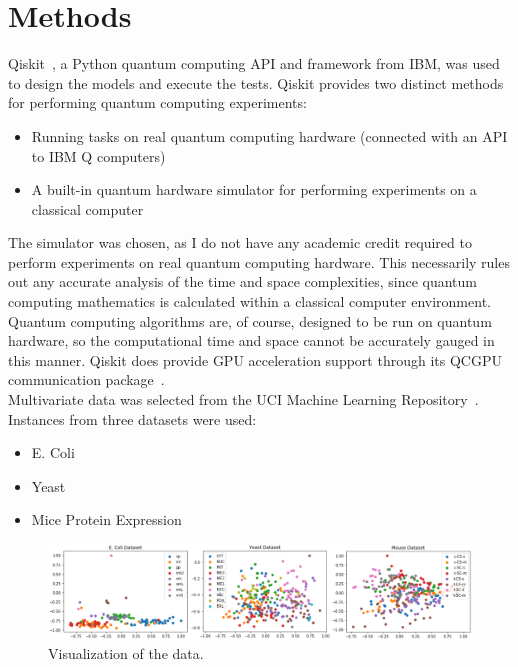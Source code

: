 \documentclass{article}
\begin{document}
\section{Methods}
  Qiskit~\cite{ibm}, a Python quantum computing API and framework from IBM, was used to design the models and execute the tests. Qiskit provides two distinct methods for performing quantum computing experiments:

    \begin{itemize}
      \item{Running tasks on real quantum computing hardware (connected with an API to IBM Q computers)}
      \item{A built-in quantum hardware simulator for performing experiments on a classical computer}
    \end{itemize}

  The simulator was chosen, as I do not have any academic credit required to perform experiments on real quantum computing hardware. This necessarily rules out any accurate analysis of the time and space complexities, since quantum computing mathematics is calculated within a classical computer environment. Quantum computing algorithms are, of course, designed to be run on quantum hardware, so the computational time and space cannot be accurately gauged in this manner. Qiskit does provide GPU acceleration support through its QCGPU communication package~\cite{qcgpu}. \\

  Multivariate data was selected from the UCI Machine Learning Repository~\cite{uci}. Instances from three datasets were used:

    \begin{itemize}
      \item E. Coli~\cite{ecoli}
      \item Yeast~\cite{yeast}
      \item Mice Protein Expression~\cite{mouse}
    \end{itemize}

    \begin{figure}[h]
      \centering
      \includegraphics[width=1\textwidth]{data.png}
      \caption{\label{fig:data}Visualization of the data.}
    \end{figure}
\end{document}
